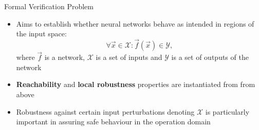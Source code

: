 \documentclass[10pt]{beamer}
\begin{document}

\begin{frame}{Formal Verification Problem}
\begin{itemize} \itemsep 1.5em
    \item Aims to establish whether neural networks behave as intended in
        regions of the input space:
        \[
            \forall \vec x \in \mathcal X \colon \vec f(\vec x) \in \mathcal Y,
        \]
        where $\vec f$ is a network, $\mathcal X$  is a set of inputs and
        $\mathcal Y$ is a set of outputs of the network
    
    \item {\bf Reachability} and {\bf local robustness} properties are instantiated from 
        from above

    \item Robustness against certain input perturbations denoting $\mathcal
        X$ is particularly important in assuring safe behaviour in the
        operation domain
\end{itemize}

\end{frame}



%







    
\end{document}
